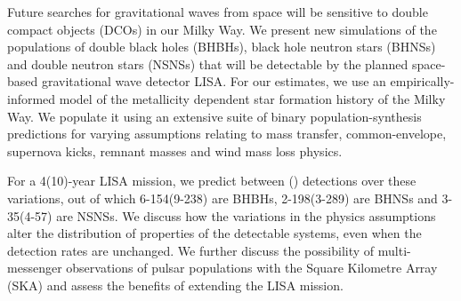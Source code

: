Future searches for gravitational waves from space will be sensitive to double compact objects (DCOs) in our Milky Way. We present new simulations of the populations of double black holes (BHBHs), black hole neutron stars (BHNSs) and double neutron stars (NSNSs) that will be detectable by the planned space-based gravitational wave detector LISA. 
%
For our estimates, we use an empirically-informed model of the metallicity dependent star formation history of the Milky Way. We populate it using an extensive suite of binary population-synthesis predictions for varying assumptions relating to mass transfer, common-envelope, supernova kicks, remnant masses and wind mass loss physics.

For a 4(10)-year LISA mission, we predict between \rangeFourYear{}(\rangeTenYear{}) detections over these variations, out of which 6-154(9-238) are BHBHs, 2-198(3-289) are BHNSs and 3-35(4-57) are NSNSs.
%
 We discuss how the variations in the physics assumptions alter the distribution of properties of the detectable systems, even when the detection rates are unchanged. We further discuss the possibility of multi-messenger observations of pulsar populations with the Square Kilometre Array (SKA) and assess the benefits of extending the LISA mission. 

